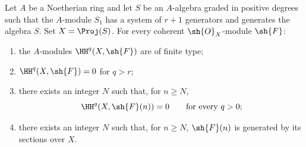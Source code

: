\begin{proposition}[2.2.2]
\label{III.2.2.2}
Let $A$ be a Noetherian ring and let $S$ be an $A$-algebra graded in positive degrees such that the $A$-module $S_1$ has a system of $r+1$ generators and generates the algebra $S$.
Set $X=\Proj(S)$.
For every coherent $\sh{O}_X$-module $\sh{F}$:
\begin{enumerate}
  \item[{\rm(i)}] the $A$-modules $\HH^q(X,\sh{F})$ are of finite type;
  \item[{\rm(ii)}] $\HH^q(X,\sh{F})=0$ for $q>r$;
  \item[{\rm(iii)}] there exists an integer $N$ such that, for $n\geq N$,
  \[
    \HH^q(X,\sh{F}(n))=0
    \qquad\text{for every }q>0;
  \]
  \item[{\rm(iv)}] there exists an integer $N$ such that, for $n\geq N$, $\sh{F}(n)$ is generated by its sections over $X$.
\end{enumerate}
\end{proposition}

